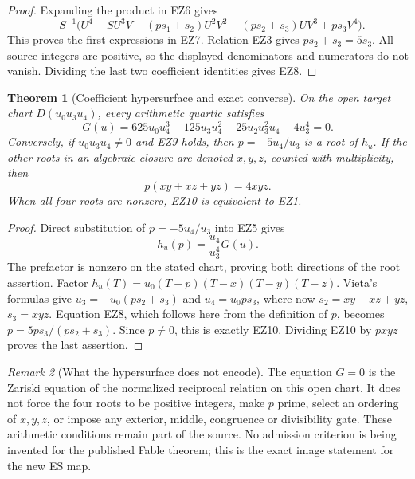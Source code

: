 \documentclass[11pt]{article}
\newtheorem{theorem}{Theorem}[section]
\theoremstyle{definition}\newtheorem{definition}[theorem]{Definition}
\theoremstyle{remark}\newtheorem{remark}[theorem]{Remark}
\begin{document}
\begin{proof}
Expanding the product in EZ6 gives
\[
 -S^{-1}\bigl(U^4-SU^3V+(ps_1+s_2)U^2V^2
 -(ps_2+s_3)UV^3+ps_3V^4\bigr).
\]
This proves the first expressions in EZ7.  Relation EZ3 gives
\(ps_2+s_3=5s_3\).  All source integers are positive, so the displayed
denominators and numerators do not vanish.  Dividing the last two coefficient
identities gives EZ8.
\end{proof}

\begin{theorem}[Coefficient hypersurface and exact converse]
On the open target chart \(D(u_0u_3u_4)\), every arithmetic quartic satisfies
\begin{equation}
 \boxed{G(u)=625u_0u_4^3-125u_3u_4^2
       +25u_2u_3^2u_4-4u_3^4=0.}                       \tag{EZ9}
\end{equation}
Conversely, if \(u_0u_3u_4\ne0\) and EZ9 holds, then
\(p=-5u_4/u_3\) is a root of \(h_u\).  If the other roots in an algebraic
closure are denoted \(x,y,z\), counted with multiplicity, then
\begin{equation}
 p(xy+xz+yz)=4xyz.                                      \tag{EZ10}
\end{equation}
When all four roots are nonzero, EZ10 is equivalent to EZ1.
\end{theorem}

\begin{proof}
Direct substitution of \(p=-5u_4/u_3\) into EZ5 gives
\[
 h_u(p)=\frac{u_4}{u_3^4}G(u).
\]
The prefactor is nonzero on the stated chart, proving both directions of
the root assertion.  Factor
\(h_u(T)=u_0(T-p)(T-x)(T-y)(T-z)\).  Vieta's formulas give
\(u_3=-u_0(ps_2+s_3)\) and \(u_4=u_0ps_3\), where now
\(s_2=xy+xz+yz\), \(s_3=xyz\).  Equation EZ8, which follows here from
the definition of \(p\), becomes
\(p=5ps_3/(ps_2+s_3)\).  Since \(p\ne0\), this is exactly EZ10.
Dividing EZ10 by \(pxyz\) proves the last assertion.
\end{proof}

\begin{remark}[What the hypersurface does not encode]
The equation \(G=0\) is the Zariski equation of the normalized reciprocal
relation on this open chart.  It does not force the four roots to be positive
integers, make \(p\) prime, select an ordering of \(x,y,z\), or impose any
exterior, middle, congruence or divisibility gate.  These arithmetic conditions
remain part of the source.  No admission criterion is being invented for the
published Fable theorem; this is the exact image statement for the new ES map.
\end{remark}
\end{document}
